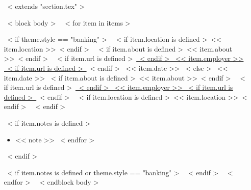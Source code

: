 ~< extends "section.tex" >~

~< block body >~
  ~< for item in items >~
    \begin{samepage}
      \cventry
        ~< if theme.style == "banking" >~
          {~< if item.location is defined >~<< item.location >>~< endif >~}
          {~< if item.about is defined >~<< item.about >>~< endif >~}
          {~< if item.url is defined >~\href{item.url}{~< endif >~%
             << item.employer >>%
           ~< if item.url is defined >~}~< endif >~}
          {<< item.date >>}
        ~< else >~
          {<< item.date >>}
          {~< if item.about is defined >~<< item.about >>~< endif >~}
          {~< if item.url is defined >~\href{item.url}{~< endif >~%
             << item.employer >>%
           ~< if item.url is defined >~}~< endif >~}
          {~< if item.location is defined >~<< item.location >>~< endif >~}
        ~< endif >~
        {}
        {
          ~< if item.notes is defined >~
            \begin{itemize}
              ~< for note in item.notes >~
                \item{<< note >>}
              ~< endfor >~
            \end{itemize}
          ~< endif >~
        }
    \end{samepage}
    ~< if item.notes is defined or theme.style == "banking" >~
      \vspace{10pt}
    ~< endif >~
  ~< endfor >~
  \vspace{-10pt}
~< endblock body >~